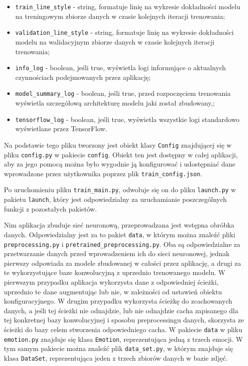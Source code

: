 \begin{itemize}
    \item \verb|train_line_style| - string, formatuje linię na wykresie dokładności modelu na treningowym zbiorze danych w czasie kolejnych iteracji trenowania;
    \item \verb|validation_line_style| - string, formatuje linię na wykresie dokładności modelu na walidacyjnym zbiorze danych w czasie kolejnych iteracji trenowania;
    \item \verb|info_log| - boolean, jeśli true, wyświetla logi informujące o aktualnych czynnościach podejmowanych przez aplikację;
    \item \verb|model_summary_log| - boolean, jeśli true, przed rozpoczęciem trenowania wyświetla szczegółową architekturę modelu jaki został zbudowany,;
    \item \verb|tensorflow_log| - boolean, jeśli true, wyświetla wszystkie logi standardowo wyświetlane przez TensorFlow.
\end{itemize}
Na podstawie tego pliku tworzony jest obiekt klasy \verb|Config| znajdującej się w pliku \verb|config.py| w pakiecie \verb|config|. Obiekt ten jest dostępny w całej aplikacji, aby za jego pomocą można było wygodnie ją konfigurować i udostępniać dane wprowadzone przez użytkownika poprzez plik \verb|train_config.json|.

Po uruchomieniu pliku \verb|train_main.py|, odwołuje się on do pliku \verb|launch.py| w pakietu \verb|launch|, który jest odpowiedzialny za uruchamianie poszczególnych funkcji z pozostałych pakietów.

Nim aplikacja zbuduje sieć neuronową, przeprowadzana jest wstępna obróbka danych. Odpowiedzialny jest za to pakiet \verb|data|, w którym można znaleźć pliki \verb|preprocessing.py| i \verb|pretrained_preprocessing.py|. Oba są odpowiedzialne za przetwarzanie danych przed wprowadzeniem ich do sieci neuronowej, jednak pierwszy odpowiada za modele zbudowanej w całości przez aplikację, a drugi za te wykorzystujące baze konwolucyjną z uprzednio trenowanego modelu.
W pierwszym przypadku aplikacja wykorzysta dane z odpowiedniej ścieżki, uprzednio te dane augmentując lub nie, w zależności od ustawień obiektu konfiguracyjnego. W drugim przypadku wykorzysta ścieżkę do zcachowanych danych, a jeśli tej ścieżki nie odnajdzie, lub nie odnajdzie cacha zapisanego dla tej konkretnej bazy konwolucyjnej i sposobu preprocessingu danych, skorzysta ze ścieżki do bazy celem stworzenia odpowiedniego cacha.
W pakiecie \verb|data| w pliku \verb|emotion.py| znajduje się klasa \verb|Emotion|, reprezentująca jedną z trzech emocji. W tym samym pakiecie można znaleźć plik \verb|data_set.py|, w którym znajduje się klasa \verb|DataSet|, reprezentująca jeden z trzech zbiorów danych w bazie zdjęć.

